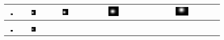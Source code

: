 \documentclass[conference,compsoc]{IEEEtran}
\begin{document}
\begin{figure}[!h]
\setlength\tabcolsep{0.1em}
\begin{tabular}{ccccc}
\includegraphics[width=0.19\textwidth]{images/true-field-t=50} &
\includegraphics[width=0.19\textwidth]{images/true-field-t=641} &
\includegraphics[width=0.19\textwidth]{images/true-field-t=1232} &
\includegraphics[width=0.19\textwidth]{images/true-field-t=3006} &
\includegraphics[width=0.19\textwidth]{images/true-field-t=4089} \\
\hline \\
\includegraphics[width=0.19\textwidth]{images/field-t=50} & 
\includegraphics[width=0.19\textwidth]{images/field-t=641} &

\end{tabular}
\end{figure}
\end{document}
